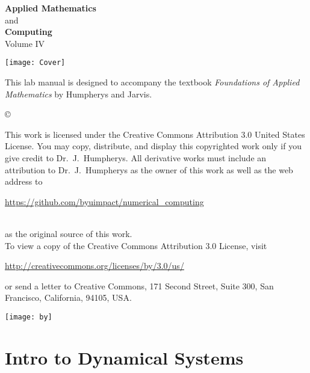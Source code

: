 \documentclass[nociteref]{SIAM-GH-book}
\begin{document}
\thispagestyle{empty}
\begin{center}
{\huge \bf Applied Mathematics} \\ and \\ {\huge \bf Computing} \\
\vspace{5mm}
{\Large Volume IV}
\vspace{20mm}

\texttt{[image: Cover]}
\end{center}
\frontmatter




\begin{thepreface}
This lab manual is designed to accompany the textbook \emph{Foundations of Applied Mathematics} by Humpherys and Jarvis.

\vfill
\copyright{This work is licensed under the Creative Commons Attribution 3.0 United States 
License.  You may copy, distribute, and display this copyrighted work only if you give 
credit to Dr.~J.~Humpherys. All derivative works must include an attribution to Dr.~J.~Humpherys as the owner of this work as well as the web address to 
\\\centerline{\url{https://github.com/byuimpact/numerical_computing}}\\ as the original source of 
this 
work.\\To view a copy of the Creative Commons Attribution 3.0 License, 
visit\\\centerline{\url{http://creativecommons.org/licenses/by/3.0/us/}} or send a letter to 
Creative Commons, 171 Second Street, Suite 300, San Francisco, California, 94105, USA.}

\vfill
\centering\texttt{[image: by]}
\vfill
\end{thepreface}

\setcounter{tocdepth}{1}
\tableofcontents

\mainmatter

\part{Intro to Dynamical Systems}
\end{document}
